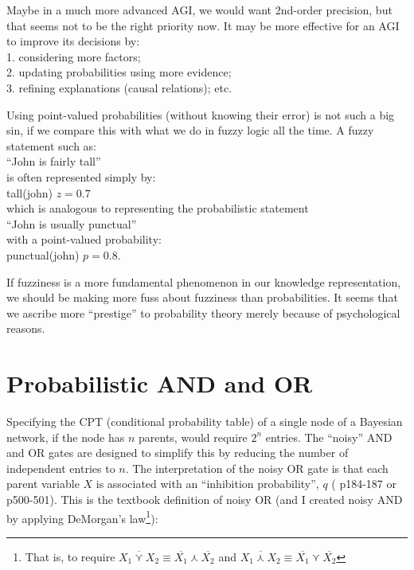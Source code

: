 Maybe in a much more advanced AGI, we would want 2nd-order precision, but that seems not to be the right priority now.  It may be more effective for an AGI to improve its decisions by:\\
\hspace*{1cm} 1. considering more factors;\\
\hspace*{1cm} 2. updating probabilities using more evidence;\\
\hspace*{1cm} 3. refining explanations (causal relations);  etc.

Using point-valued probabilities (without knowing their error) is not such a big sin, if we compare this with what we do in fuzzy logic all the time.  A fuzzy statement such as:\\
\hspace*{1cm} ``John is fairly tall''\\
is often represented simply by:\\
\hspace*{1cm} tall(john) \hspace{0.5cm} $z = 0.7$\\
which is analogous to representing the probabilistic statement\\
\hspace*{1cm} ``John is usually punctual''\\
with a point-valued probability:\\
\hspace*{1cm} punctual(john) \hspace{0.5cm} $p = 0.8$.

If fuzziness is a more fundamental phenomenon in our knowledge representation, we should be making more fuss about fuzziness than probabilities.  It seems that we ascribe more ``prestige'' to probability theory merely because of psychological reasons.

\section{Probabilistic AND and OR}
\label{sec:P-and-or}

Specifying the CPT (conditional probability table) of a single node of a Bayesian network, if the node has $n$ parents, would require $2^n$ entries.  The ``noisy'' AND and OR gates are designed to simplify this by reducing the number of independent entries to $n$.  The interpretation of the noisy OR gate is that each parent variable $X$ is associated with an ``inhibition probability'', $q$ (\citep*{Pearl1988} p184-187 or \citep*{Russell2003} p500-501).  This is the textbook definition of noisy OR (and I created noisy AND by applying DeMorgan's law\footnote{That is, to require $\overline{X_1 \curlyvee X_2} \equiv \overline{X_1} \curlywedge \overline{X_2}$ and $\overline{X_1 \curlywedge X_2} \equiv \overline{X_1} \curlyvee \overline{X_2}$ }):

